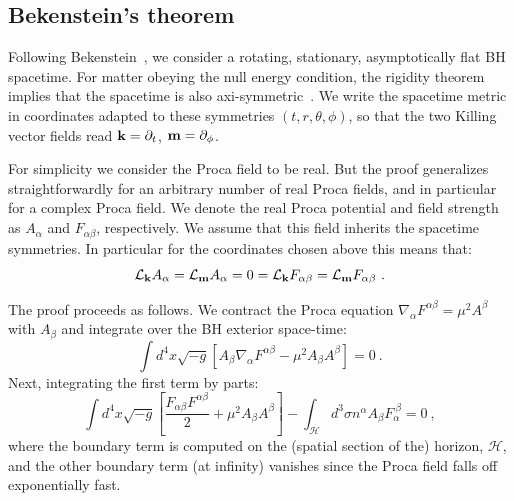 \documentclass{article}
\numberwithin{equation}{section}
\begin{document}
\subsection{Bekenstein's theorem}
\label{sec_nohair1}
Following Bekenstein~\cite{Bekenstein:1971hc,Bekenstein:1972ky}, we consider a rotating, stationary, asymptotically flat BH spacetime. For matter obeying the null energy condition, the rigidity theorem implies that the spacetime is also axi-symmetric~\cite{Hawking:1971vc}. We write the spacetime metric in coordinates adapted to these symmetries $(t,r,\theta,\phi)$, so that the two Killing vector fields read ${\bf k}=\partial_t$, ${\bf m}=\partial_\phi$.


For simplicity we consider the Proca field to be real. But the proof generalizes straightforwardly for an arbitrary number of real Proca fields, and in particular for a complex Proca field. We denote the real Proca potential and field strength as $A_\alpha$ and $F_{\alpha\beta}$, respectively. We assume that this field inherits the spacetime symmetries. In particular for the coordinates chosen above 
this means that: 
\begin{equation}
\mathcal{L}_{\bf k} A_\alpha=\mathcal{L}_{\bf m} A_\alpha=0=\mathcal{L}_{\bf k} F_{\alpha\beta}=\mathcal{L}_{\bf m} F_{\alpha\beta} \ .
\label{symmetriesaf}
\end{equation}

The proof proceeds as follows. We contract the Proca equation $\nabla_\alpha F^{\alpha\beta}=\mu^2 A^\beta$ with $A_\beta$ and integrate over the BH exterior space-time:
\begin{equation}
\int d^4x\sqrt{-g}\left[A_\beta\nabla_\alpha F^{\alpha\beta}-\mu^2 A_\beta A^\beta\right]=0 \ .
\end{equation}
Next, integrating the first term by parts:
\begin{equation}
\int d^4x\sqrt{-g}\left[\frac{F_{\alpha\beta} F^{\alpha\beta}}{2}+\mu^2 A_\beta A^\beta\right]-\int_{\mathcal{H}}d^3\sigma n^\alpha A_\beta F_{\alpha}^{\ \beta}=0 \ ,
\label{bek1}
\end{equation}
where the boundary term is computed on the (spatial section of the) horizon, $\mathcal{H}$, and the other boundary term (at infinity) vanishes since the Proca field falls off exponentially fast.
\end{document}
